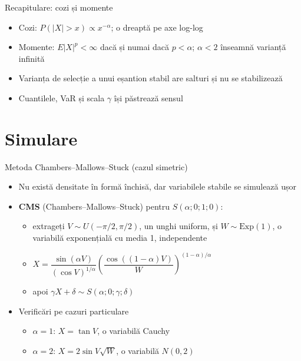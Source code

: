 \begin{frame}{Recapitulare: cozi și momente}
\itemsize{\small}
\begin{itemize}
    \item Cozi: $P(|X| > x) \propto x^{-\alpha}$; o dreaptă pe axe log-log
    \item Momente: $E|X|^p < \infty$ dacă și numai dacă $p < \alpha$; $\alpha < 2$ înseamnă varianță infinită
    \item Varianța de selecție a unui eșantion stabil are salturi și nu se stabilizează
    \item Cuantilele, VaR și scala $\gamma$ își păstrează sensul
\end{itemize}
\end{frame}


\section{Simulare}

\begin{frame}{Metoda Chambers--Mallows--Stuck (cazul simetric)}
\itemsize{\small}
\begin{itemize}
    \item Nu există densitate în formă închisă, dar variabilele stabile se simulează ușor 
    \item \textbf{CMS} (Chambers--Mallows--Stuck) pentru $S(\alpha; 0; 1; 0)$:
    \begin{itemize}
        \item extrageți $V \sim U(-\pi/2, \pi/2)$, un unghi uniform, și $W \sim \mathrm{Exp}(1)$, o variabilă exponențială cu media 1, independente
        \item $X = \dfrac{\sin(\alpha V)}{(\cos V)^{1/\alpha}} \left(\dfrac{\cos((1 - \alpha)V)}{W}\right)^{(1 - \alpha)/\alpha}$
        \item apoi $\gamma X + \delta \sim S(\alpha; 0; \gamma; \delta)$
    \end{itemize}
    \item Verificări pe cazuri particulare
    \begin{itemize}
        \item $\alpha = 1$: $X = \tan V$, o variabilă Cauchy
        \item $\alpha = 2$: $X = 2\sin V\sqrt{W}$, o variabilă $N(0, 2)$
    \end{itemize}
\end{itemize}
\end{frame}

